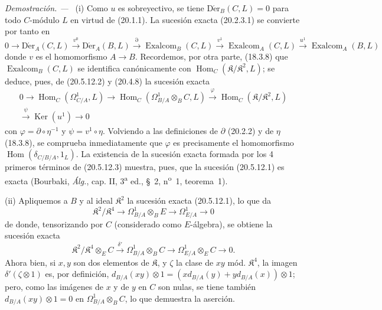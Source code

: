 \documentclass[10pt,oneside]{book}
\newcommand{\oldpage}[2][]{%
  \setcounter{footnote}{0}%
  \marginpar{\scriptsize\textbf{#1}~|~#2}\ignorespaces}
\newenvironment{proof}{%
  \par\medskip\noindent\textit{Demostración. ---\ }}{\par}
\begin{document}
\begin{proof}
\oldpage[0\textsubscript{IV-1}]{134}
(i) Como $u$ es sobreyectivo, se tiene $\operatorname{D\acute{e}r}_B(C,L)=0$ para todo $C$-módulo
$L$ en virtud de (20.1.1). La sucesión exacta (20.2.3.1) se convierte por tanto en
\begin{equation}
\tag{20.5.12.2}
\label{0.20.5.12.2-es}
  0\longrightarrow\operatorname{D\acute{e}r}_A(C,L)\xrightarrow{v^0}\operatorname{D\acute{e}r}_A(B,L)
  \xrightarrow{\partial}\operatorname{Exalcom}_B(C,L)
  \xrightarrow{v^1}\operatorname{Exalcom}_A(C,L)
  \xrightarrow{u^1}\operatorname{Exalcom}_A(B,L)
\end{equation}
donde $v$ es el homomorfismo $A\to B$. Recordemos, por otra parte, (18.3.8) que
$\operatorname{Exalcom}_B(C,L)$ se identifica canónicamente con
$\operatorname{Hom}_C(\mathfrak K/\mathfrak K^2,L)$; se deduce, pues, de (20.5.12.2)
y (20.4.8) la sucesión exacta
\begin{equation}
\tag{20.5.12.3}
\label{0.20.5.12.3-es}
\begin{split}
  0\longrightarrow\operatorname{Hom}_C(\Omega^1_{C/A},L)
  \longrightarrow\operatorname{Hom}_C(\Omega^1_{B/A}\otimes_B C,L)
  \xrightarrow{\varphi}\operatorname{Hom}_C(\mathfrak K/\mathfrak K^2,L)\\
  \xrightarrow{\psi}\operatorname{Ker}(u^1)\longrightarrow 0
\end{split}
\end{equation}
con $\varphi=\partial\circ\eta^{-1}$ y $\psi=v^1\circ\eta$. Volviendo
a las definiciones de $\partial$ (20.2.2) y de $\eta$ (18.3.8), se comprueba
inmediatamente que $\varphi$ es precisamente el homomorfismo
$\operatorname{Hom}(\delta_{C/B/A},1_L)$. La existencia de la sucesión exacta formada por los
4 primeros términos de (20.5.12.3) muestra, pues, que la sucesión (20.5.12.1)
es exacta (Bourbaki, \emph{Álg.}, cap. II, 3\textsuperscript{a} ed.,
\S~2, n\textsuperscript{o}~1, teorema~1).

\medskip
(ii) Apliquemos a $B$ y al ideal $\mathfrak K^2$ la sucesión exacta
(20.5.12.1), lo que da
\begin{equation}
\tag{20.5.12.4}
\label{0.20.5.12.4-es}
  \mathfrak K^2/\mathfrak K^4\longrightarrow
  \Omega^1_{B/A}\otimes_B E\longrightarrow\Omega^1_{E/A}\longrightarrow 0
\end{equation}
de donde, tensorizando por $C$ (considerado como $E$-álgebra), se obtiene la sucesión
exacta
\[
  \mathfrak K^2/\mathfrak K^4\otimes_E C\xrightarrow{\delta'}
  \Omega^1_{B/A}\otimes_B C\longrightarrow
  \Omega^1_{E/A}\otimes_E C\longrightarrow 0.
\]
Ahora bien, si $x,y$ son dos elementos de $\mathfrak K$, y $\zeta$ la clase
de $xy$ mód. $\mathfrak K^4$, la imagen
$\delta'(\zeta\otimes1)$ es, por definición,
$d_{B/A}(xy)\otimes1=(xd_{B/A}(y)+yd_{B/A}(x))\otimes1$; pero, como las
imágenes de $x$ y de $y$ en $C$ son nulas, se tiene también
$d_{B/A}(xy)\otimes1=0$ en $\Omega^1_{B/A}\otimes_B C$, lo que demuestra
la aserción.


\end{proof}
\end{document}
